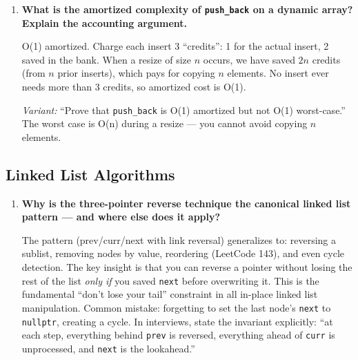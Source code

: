\begin{enumerate}
\item \textbf{What is the amortized complexity of \texttt{push\_back} on a dynamic array? Explain the accounting argument.}

O(1) amortized. Charge each insert 3 ``credits'': 1 for the actual insert, 2 saved in the bank. When a resize of size $n$ occurs, we have saved $2n$ credits (from $n$ prior inserts), which pays for copying $n$ elements. No insert ever needs more than 3 credits, so amortized cost is O(1).

\textit{Variant:} ``Prove that \texttt{push\_back} is O(1) amortized but not O(1) worst-case.'' The worst case is O(n) during a resize — you cannot avoid copying $n$ elements.
\end{enumerate}

\subsection{Linked List Algorithms}

\begin{enumerate}
\item \textbf{Why is the three-pointer reverse technique the canonical linked list pattern — and where else does it apply?}

The pattern (prev/curr/next with link reversal) generalizes to: reversing a sublist, removing nodes by value, reordering (LeetCode 143), and even cycle detection. The key insight is that you can reverse a pointer without losing the rest of the list \textit{only if} you saved \texttt{next} before overwriting it. This is the fundamental ``don't lose your tail'' constraint in all in-place linked list manipulation. Common mistake: forgetting to set the last node's \texttt{next} to \texttt{nullptr}, creating a cycle. In interviews, state the invariant explicitly: ``at each step, everything behind \texttt{prev} is reversed, everything ahead of \texttt{curr} is unprocessed, and \texttt{next} is the lookahead.''
\end{enumerate}

